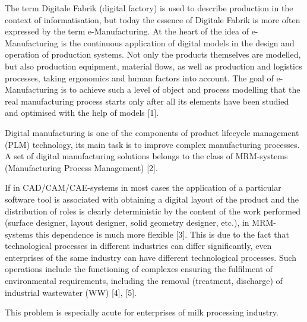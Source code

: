 \documentclass[a4paper, 10pt,twocolumn]{article}
\begin{document}
The term Digitale Fabrik (digital factory) is used to
describe production in the context of informatisation,
but today the essence of Digitale Fabrik is more often
expressed by the term e-Manufacturing. At the heart of
the idea of e-Manufacturing is the continuous application of digital models in the design and operation of
production systems. Not only the products themselves are
modelled, but also production equipment, material flows,
as well as production and logistics processes, taking
ergonomics and human factors into account. The goal of
e-Manufacturing is to achieve such a level of object and
process modelling that the real manufacturing process
starts only after all its elements have been studied and
optimised with the help of models [1].
\par Digital manufacturing is one of the components of
product lifecycle management (PLM) technology, its
main task is to improve complex manufacturing processes. A set of digital manufacturing solutions belongs
to the class of MRM-systems (Manufacturing Process
Management) [2].
\par If in CAD/CAM/CAE-systems in most cases the application of a particular software tool is associated with
obtaining a digital layout of the product and the distribution of roles is clearly deterministic by the content of
the work performed (surface designer, layout designer,
solid geometry designer, etc.), in MRM-systems this
dependence is much more flexible [3]. This is due to the
fact that technological processes in different industries
can differ significantly, even enterprises of the same
industry can have different technological processes. Such
operations include the functioning of complexes ensuring
the fulfilment of environmental requirements, including
the removal (treatment, discharge) of industrial wastewater (WW) [4], [5].
\par This problem is especially acute for enterprises of milk
processing industry.


\end{document}

